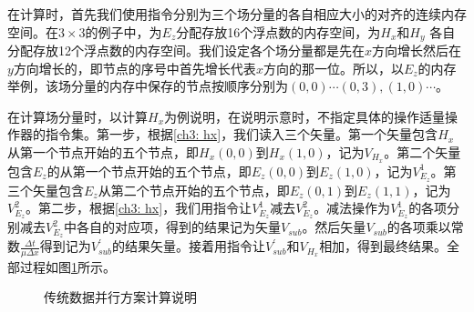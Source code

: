 在计算时，首先我们使用指令分别为三个场分量的各自相应大小的对齐的连续内存空间。在$3\times3$的例子中，为$E_z$分配存放16个浮点数的内存空间，为$H_x$和$H_y$ 各自分配存放12个浮点数的内存空间。我们设定各个场分量都是先在$x$方向增长然后在$y$方向增长的，即节点的序号中首先增长代表$x$方向的那一位。所以，以$E_z$\linebreak[4]的内存举例，该场分量的内存中保存的节点按顺序分别为$(0,0)\cdots(0,3),(1,0)\cdots$。

在计算场分量时，以计算$H_x$为例说明，在说明示意时，不指定具体的操作适量操作器的指令集。第一步，根据\eqref{ch3: hx}，我们读入三个矢量。第一个矢量包含$H_x$从第一个节点开始的五个节点，即$H_x(0,0)$到$H_x(1,0)$，记为$V_{H_x}$。第二个矢量包含$E_z$的从第一个节点开始的五个节点，即$E_z(0,0)$到$E_z(1,0)$，记为$V_{E_z}^1$。第三个矢量包含$E_z$从第二个节点开始的五个节点，即$E_z(0,1)$到$E_z(1,1)$，记为$V_{E_z}^2$。第二步，根据\eqref{ch3: hx}，我们用指令让$V_{E_z}^1$减去$V_{E_z}^2$。减法操作为$V_{E_z}^1$的各项分别减去$V_{E_z}^2$中各自的对应项，得到的结果记为矢量$V_{sub}$。然后矢量$V_{sub}$的各项乘以常数$\frac{\Delta t}{\mu\Delta x}$得到记为$V_{sub}^{'}$的结果矢量。接着用指令让$V_{sub}^{'}$和$V_{H_x}$相加，得到最终结果。全部过程如图\ref{ch3 fig:cmp}所示。

\begin{figure}[hp]
\centering
\def \yshift {-1}
\def \xshift {1}
\caption{传统数据并行方案计算说明}
\label{ch3 fig:cmp}
\end{figure}


